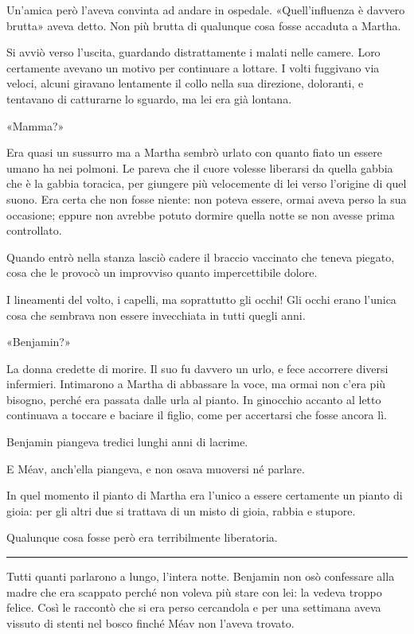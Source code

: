 \documentclass[a4paper,11pt,oneside,openright,final]{memoir}
\begin{document}
Un’amica però l’aveva convinta ad andare in ospedale. «Quell’influenza
è davvero brutta» aveva detto. Non più brutta di qualunque cosa fosse
accaduta a Martha.

Si avviò verso l’uscita, guardando distrattamente i malati nelle camere. Loro
certamente avevano un motivo per continuare a lottare. I volti fuggivano via
veloci, alcuni giravano lentamente il collo nella sua direzione, doloranti, e
tentavano di catturarne lo sguardo, ma lei era già lontana.

«Mamma?»

Era quasi un sussurro ma a Martha sembrò urlato con quanto fiato un essere
umano ha nei polmoni. Le pareva che il cuore volesse liberarsi da quella gabbia
che è la gabbia toracica, per giungere più velocemente di lei verso
l’origine di quel suono. Era certa che non fosse niente: non poteva essere,
ormai aveva perso la sua occasione; eppure non avrebbe potuto dormire quella
notte se non avesse prima controllato.

Quando entrò nella stanza lasciò cadere il braccio vaccinato che teneva
piegato, cosa che le provocò un improvviso quanto impercettibile dolore.

I lineamenti del volto, i capelli, ma soprattutto gli occhi! Gli occhi erano
l’unica cosa che sembrava non essere invecchiata in tutti quegli anni.

«Benjamin?»

La donna credette di morire. Il suo fu davvero un urlo, e fece accorrere diversi
infermieri. Intimarono a Martha di abbassare la voce, ma ormai non c’era più
bisogno, perché era passata dalle urla al pianto. In ginocchio accanto al letto
continuava a toccare e baciare il figlio, come per accertarsi che fosse ancora
lì.

Benjamin piangeva tredici lunghi anni di lacrime.

E Méav, anch’ella piangeva, e non osava muoversi né parlare.

In quel momento il pianto di Martha era l’unico a essere certamente un pianto
di gioia: per gli altri due si trattava di un misto di gioia, rabbia e stupore.

Qualunque cosa fosse però era terribilmente liberatoria.

\plainbreak{1}

Tutti quanti parlarono a lungo, l’intera notte. Benjamin non osò confessare
alla madre che era scappato perché non voleva più stare con lei: la vedeva
troppo felice. Così le raccontò che si era perso cercandola e per una
settimana aveva vissuto di stenti nel bosco finché Méav non l’aveva trovato.
\end{document}
